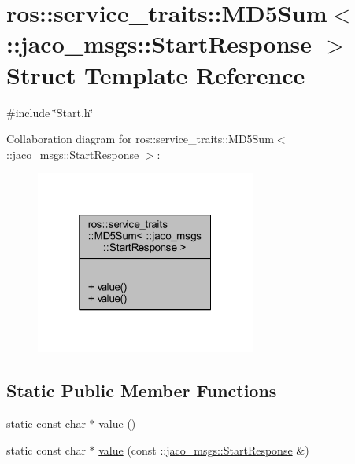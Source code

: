 \hypertarget{structros_1_1service__traits_1_1MD5Sum_3_01_1_1jaco__msgs_1_1StartResponse_01_4}{}\section{ros\+:\+:service\+\_\+traits\+:\+:M\+D5\+Sum$<$ \+:\+:jaco\+\_\+msgs\+:\+:Start\+Response $>$ Struct Template Reference}
\label{structros_1_1service__traits_1_1MD5Sum_3_01_1_1jaco__msgs_1_1StartResponse_01_4}


{\ttfamily \#include \char`\"{}Start.\+h\char`\"{}}



Collaboration diagram for ros\+:\+:service\+\_\+traits\+:\+:M\+D5\+Sum$<$ \+:\+:jaco\+\_\+msgs\+:\+:Start\+Response $>$\+:
\nopagebreak
\begin{figure}[H]
\begin{center}
\leavevmode
\includegraphics[width=205pt]{df/ddb/structros_1_1service__traits_1_1MD5Sum_3_01_1_1jaco__msgs_1_1StartResponse_01_4__coll__graph}
\end{center}
\end{figure}
\subsection*{Static Public Member Functions}
\begin{DoxyCompactItemize}
\item 
static const char $\ast$ \hyperlink{structros_1_1service__traits_1_1MD5Sum_3_01_1_1jaco__msgs_1_1StartResponse_01_4_a31c769639f01129d66cb9e4eb9ece5f8}{value} ()
\item 
static const char $\ast$ \hyperlink{structros_1_1service__traits_1_1MD5Sum_3_01_1_1jaco__msgs_1_1StartResponse_01_4_a28711b8642a0f77ca6129bc5c92e1970}{value} (const \+::\hyperlink{namespacejaco__msgs_ab90a2d56175265d26907e49c8a56088d}{jaco\+\_\+msgs\+::\+Start\+Response} \&)
\end{DoxyCompactItemize}


